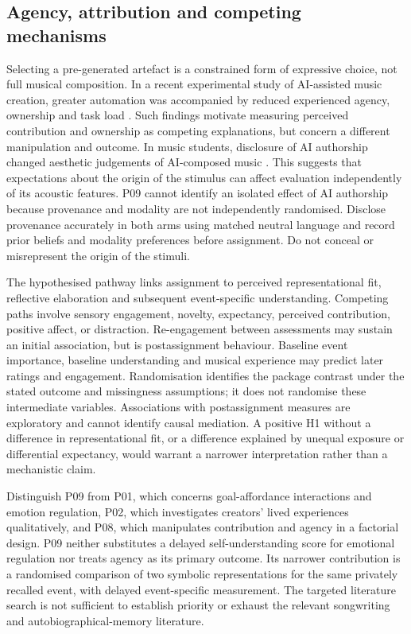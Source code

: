 \documentclass[11pt,a4paper]{article}
\begin{document}
\subsection{Agency, attribution and competing mechanisms}
Selecting a pre-generated artefact is a constrained form of expressive choice, not full musical composition. In a recent experimental study of AI-assisted music creation, greater automation was accompanied by reduced experienced agency, ownership and task load \citep{he2026}. Such findings motivate measuring perceived contribution and ownership as competing explanations, but concern a different manipulation and outcome. In music students, disclosure of AI authorship changed aesthetic judgements of AI-composed music \citep{qin2026}. This suggests that expectations about the origin of the stimulus can affect evaluation independently of its acoustic features. P09 cannot identify an isolated effect of AI authorship because provenance and modality are not independently randomised. Disclose provenance accurately in both arms using matched neutral language and record prior beliefs and modality preferences before assignment. Do not conceal or misrepresent the origin of the stimuli.
\par The hypothesised pathway links assignment to perceived representational fit, reflective elaboration and subsequent event-specific understanding. Competing paths involve sensory engagement, novelty, expectancy, perceived contribution, positive affect, or distraction. Re-engagement between assessments may sustain an initial association, but is postassignment behaviour. Baseline event importance, baseline understanding and musical experience may predict later ratings and engagement. Randomisation identifies the package contrast under the stated outcome and missingness assumptions; it does not randomise these intermediate variables. Associations with postassignment measures are exploratory and cannot identify causal mediation. A positive H1 without a difference in representational fit, or a difference explained by unequal exposure or differential expectancy, would warrant a narrower interpretation rather than a mechanistic claim.
\par Distinguish P09 from P01, which concerns goal-affordance interactions and emotion regulation, P02, which investigates creators' lived experiences qualitatively, and P08, which manipulates contribution and agency in a factorial design. P09 neither substitutes a delayed self-understanding score for emotional regulation nor treats agency as its primary outcome. Its narrower contribution is a randomised comparison of two symbolic representations for the same privately recalled event, with delayed event-specific measurement. The targeted literature search is not sufficient to establish priority or exhaust the relevant songwriting and autobiographical-memory literature.
\end{document}
